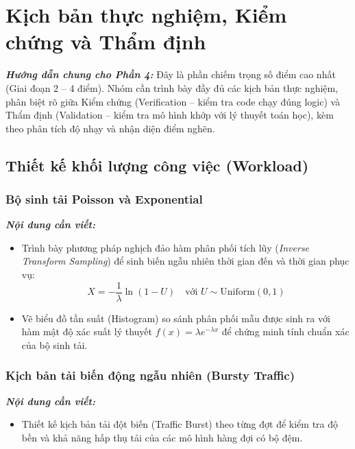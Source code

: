 \section{Kịch bản thực nghiệm, Kiểm chứng và Thẩm định}
\label{sec:thuc-nghiem-vv}

\textit{\textbf{Hướng dẫn chung cho Phần 4:}} Đây là phần chiếm trọng số điểm cao nhất (Giai đoạn 2 -- 4 điểm). Nhóm cần trình bày đầy đủ các kịch bản thực nghiệm, phân biệt rõ giữa Kiểm chứng (Verification -- kiểm tra code chạy đúng logic) và Thẩm định (Validation -- kiểm tra mô hình khớp với lý thuyết toán học), kèm theo phân tích độ nhạy và nhận diện điểm nghẽn.

\subsection{Thiết kế khối lượng công việc (Workload)}
\label{subsec:workload-design}

\subsubsection{Bộ sinh tải Poisson và Exponential}
\textit{\textbf{Nội dung cần viết:}}
\begin{itemize}[leftmargin=1.5em]
    \item Trình bày phương pháp nghịch đảo hàm phân phối tích lũy (\textit{Inverse Transform Sampling}) để sinh biến ngẫu nhiên thời gian đến và thời gian phục vụ:
    \begin{equation}
        X = -\frac{1}{\lambda} \ln(1 - U) \quad \text{với } U \sim \text{Uniform}(0, 1)
    \end{equation}
    \item Vẽ biểu đồ tần suất (Histogram) so sánh phân phối mẫu được sinh ra với hàm mật độ xác suất lý thuyết $f(x) = \lambda e^{-\lambda x}$ để chứng minh tính chuẩn xác của bộ sinh tải.
\end{itemize}

\subsubsection{Kịch bản tải biến động ngẫu nhiên (Bursty Traffic)}
\textit{\textbf{Nội dung cần viết:}}
\begin{itemize}[leftmargin=1.5em]
    \item Thiết kế kịch bản tải đột biến (Traffic Burst) theo từng đợt để kiểm tra độ bền và khả năng hấp thụ tải của các mô hình hàng đợi có bộ đệm.
\end{itemize}

